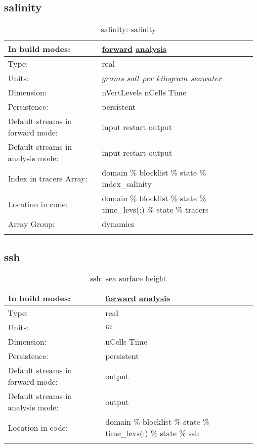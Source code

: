 \subsection[salinity]{salinity}
\label{subsec:var_sec_state_salinity}
\begin{center}
\begin{longtable}{| p{2.0in} | p{4.0in} |}
        \hline 
        In build modes: & \hyperref[subsec:forward_var_tab_state]{forward} \hyperref[subsec:analysis_var_tab_state]{analysis} \\
        \hline 
        Type: & real \\
        \hline 
        Units: & $grams$ $salt$ $per$ $kilogram$ $seawater$ \\
        \hline 
        Dimension: & nVertLevels nCells Time \\
        \hline 
        Persistence: & persistent \\
        \hline 
		 Default streams in forward mode: &  input restart output \\
        \hline 
		 Default streams in analysis mode: &  input restart output \\
        \hline 
		 Index in tracers Array: & domain \% blocklist \% state \% index\_salinity \\
		 \hline 
		 Location in code: & domain \% blocklist \% state \% time\_levs(:) \% state \% tracers \\
		 \hline 
		 Array Group: & dynamics \\
		 \hline 
    \caption{salinity: salinity}
\end{longtable}
\end{center}
\subsection[ssh]{ssh}
\label{subsec:var_sec_state_ssh}
\begin{center}
\begin{longtable}{| p{2.0in} | p{4.0in} |}
        \hline 
        In build modes: & \hyperref[subsec:forward_var_tab_state]{forward} \hyperref[subsec:analysis_var_tab_state]{analysis} \\
        \hline 
        Type: & real \\
        \hline 
        Units: & $m$ \\
        \hline 
        Dimension: & nCells Time \\
        \hline 
        Persistence: & persistent \\
        \hline 
		 Default streams in forward mode: &  output \\
        \hline 
		 Default streams in analysis mode: &  output \\
        \hline 
		 Location in code: & domain \% blocklist \% state \% time\_levs(:) \% state \% ssh \\
		 \hline 
    \caption{ssh: sea surface height}
\end{longtable}
\end{center}
